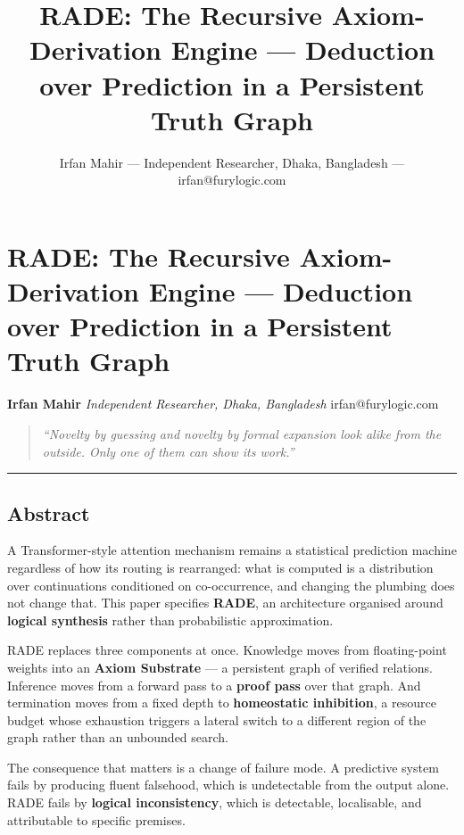 \documentclass[
  11pt,
  a4paper,
]{article}
\title{RADE: The Recursive Axiom-Derivation Engine --- Deduction over
Prediction in a Persistent Truth Graph}
\author{Irfan Mahir --- Independent Researcher, Dhaka, Bangladesh ---
irfan@furylogic.com}
\date{}
\begin{document}
\maketitle

{
\hypersetup{linkcolor=}
\setcounter{tocdepth}{3}
\tableofcontents
}
\section{RADE: The Recursive Axiom-Derivation Engine --- Deduction over
Prediction in a Persistent Truth
Graph}\label{rade-the-recursive-axiom-derivation-engine-deduction-over-prediction-in-a-persistent-truth-graph}

\textbf{Irfan Mahir} \emph{Independent Researcher, Dhaka, Bangladesh}
irfan@furylogic.com

\begin{quote}
\emph{``Novelty by guessing and novelty by formal expansion look alike
from the outside. Only one of them can show its work.''}
\end{quote}

\begin{center}\rule{0.5\linewidth}{0.5pt}\end{center}

\subsection{Abstract}\label{abstract}

A Transformer-style attention mechanism remains a statistical prediction
machine regardless of how its routing is rearranged: what is computed is
a distribution over continuations conditioned on co-occurrence, and
changing the plumbing does not change that. This paper specifies
\textbf{RADE}, an architecture organised around \textbf{logical
synthesis} rather than probabilistic approximation.

RADE replaces three components at once. Knowledge moves from
floating-point weights into an \textbf{Axiom Substrate} --- a persistent
graph of verified relations. Inference moves from a forward pass to a
\textbf{proof pass} over that graph. And termination moves from a fixed
depth to \textbf{homeostatic inhibition}, a resource budget whose
exhaustion triggers a lateral switch to a different region of the graph
rather than an unbounded search.

The consequence that matters is a change of failure mode. A predictive
system fails by producing fluent falsehood, which is undetectable from
the output alone. RADE fails by \textbf{logical inconsistency}, which is
detectable, localisable, and attributable to specific premises.
\end{document}
